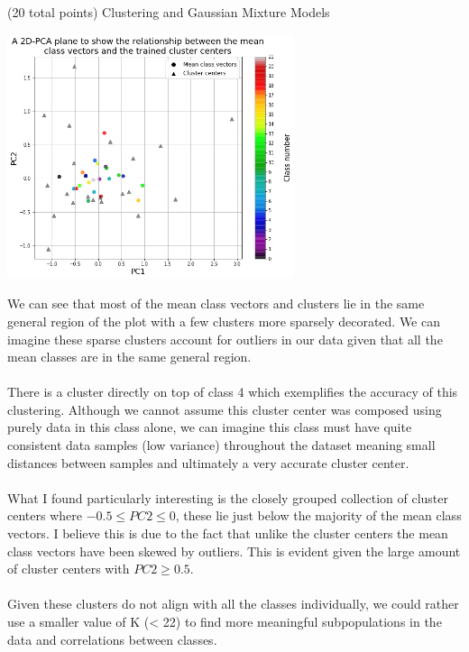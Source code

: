 \documentclass[12pt]{article}
\begin{document}
\begin{question}{(20 total points) Clustering and Gaussian Mixture Models}
\begin{subquestion}
   

      \begin{answerbox}{35em}
        \begin{center}
         \includegraphics[width=0.63\textwidth]{images/q32.png}
        \end{center}
        \scriptsize{
        We can see that most of the mean class vectors and clusters lie in the same general region of the plot with a few clusters more sparsely decorated. We can imagine these sparse clusters account for outliers in our data given that all the mean classes are in the same general region. \\
\\
        There is a cluster directly on top of class 4 which exemplifies the accuracy of this clustering. Although we cannot assume this cluster center was composed using purely data in this class alone,  we can imagine this class must have quite consistent data samples (low variance) throughout the dataset meaning small distances between samples and ultimately a very accurate cluster center.\\
\\
        What I found particularly interesting is the closely grouped collection of cluster centers where $-0.5 \leq PC2 \leq 0$, these lie just below the majority of the mean class vectors. I believe this is due to the fact that unlike the cluster centers the mean class vectors have been skewed by outliers. This is evident given the large amount of cluster centers with $PC2 \geq 0.5$.\\
\\
        Given these clusters do not align with all the classes individually, we could rather use a smaller value of K (< 22) to find more meaningful subpopulations in the data and correlations between classes.
        }
      \end{answerbox}
  



\end{subquestion}
\end{question}
\end{document}
